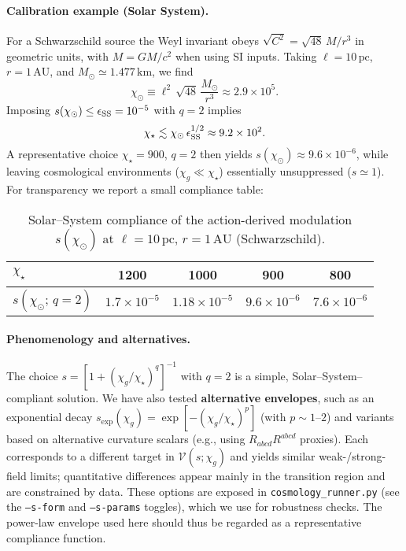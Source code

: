\documentclass[aps,prd,onecolumn,superscriptaddress,nofootinbib]{revtex4-2}
\begin{document}
\paragraph{Calibration example (Solar System).}
For a Schwarzschild source the Weyl invariant obeys \(\sqrt{C^2}=\sqrt{48}\,M/r^3\) in geometric units, with \(M=GM/c^2\) when using SI inputs. Taking \(\ell=10\,\mathrm{pc}\), \(r=1\,\mathrm{AU}\), and \(M_\odot\simeq 1.477\,\mathrm{km}\), we find
\[
\chi_\odot \equiv \ell^2 \, \sqrt{48}\,\frac{M_\odot}{r^3} \approx 2.9\times 10^{5}.
\]
Imposing \(s(\chi_\odot)\le \epsilon_{\rm SS}=10^{-5}\) with \(q=2\) implies
\[
\chi_\star \lesssim \chi_\odot\,\epsilon_{\rm SS}^{1/2} \approx 9.2\times 10^{2}.
\]
A representative choice \(\chi_\star=900\), \(q=2\) then yields \(s(\chi_\odot)\approx 9.6\times 10^{-6}\), while leaving cosmological environments (\(\chi_g\ll\chi_\star\)) essentially unsuppressed (\(s\simeq 1\)). For transparency we report a small compliance table:

\begin{table}[t]
\centering
\caption{Solar–System compliance of the action-derived modulation \(s(\chi_\odot)\) at \(\ell=10\,\mathrm{pc}\), \(r=1\,\mathrm{AU}\) (Schwarzschild).}
\label{tab:compliance}
\begin{tabular}{lcccc}
\toprule
$\chi_\star$ & 1200 & 1000 & 900 & 800 \\
\midrule
$s(\chi_\odot;\,q{=}2)$ & $1.7\times 10^{-5}$ & $1.18\times 10^{-5}$ & $9.6\times 10^{-6}$ & $7.6\times 10^{-6}$ \\
\bottomrule
\end{tabular}
\end{table}

\paragraph{Phenomenology and alternatives.}
The choice \(s=[1+(\chi_g/\chi_\star)^q]^{-1}\) with \(q=2\) is a simple, Solar–System–compliant solution. We have also tested \textbf{alternative envelopes}, such as an exponential decay \(s_{\exp}(\chi_g)=\exp[-(\chi_g/\chi_\star)^p]\) (with \(p\!\sim\!1\text{--}2\)) and variants based on alternative curvature scalars (e.g., using \(R_{abcd}R^{abcd}\) proxies). Each corresponds to a different target in \(\mathcal V(s;\chi_g)\) and yields similar weak-/strong-field limits; quantitative differences appear mainly in the transition region and are constrained by data. These options are exposed in \texttt{cosmology\_runner.py} (see the \texttt{--s-form} and \texttt{--s-params} toggles), which we use for robustness checks. The power-law envelope used here should thus be regarded as a representative compliance function.
\end{document}
